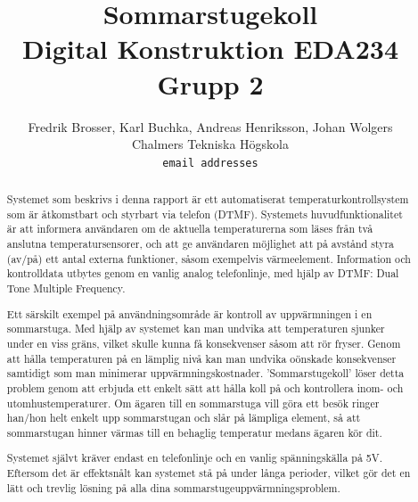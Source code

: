 \documentclass[a4paper,11pt]{article}
\begin{document}
\title{Sommarstugekoll \\
	Digital Konstruktion EDA234 \\ Grupp 2}
\author{Fredrik Brosser, Karl Buchka, Andreas Henriksson, Johan Wolgers \\
   Chalmers Tekniska Högskola \\
   \texttt{email addresses}}

\maketitle

\pagebreak

\tableofcontents

\pagebreak

\begin{abstract}

	Systemet som beskrivs i denna rapport är ett automatiserat temperaturkontrollsystem som är åtkomstbart och styrbart via
	telefon (DTMF). Systemets huvudfunktionalitet är att informera användaren om de aktuella temperaturerna som läses från
	två anslutna temperatursensorer, och att ge användaren möjlighet att på avstånd styra (av/på) ett antal externa funktioner,
	såsom exempelvis värmeelement. Information och kontrolldata utbytes genom en vanlig analog telefonlinje, med hjälp av DTMF:
	Dual Tone Multiple Frequency. 

	Ett särskilt exempel på användningsområde är kontroll av uppvärmningen i en sommarstuga. Med hjälp av systemet kan man
	undvika att temperaturen sjunker under en viss gräns, vilket skulle kunna få konsekvenser såsom att rör fryser. Genom att
	hålla temperaturen på en lämplig nivå kan man undvika oönskade konsekvenser samtidigt som man minimerar uppvärmningskostnader.
	'Sommarstugekoll' löser detta problem genom att erbjuda ett enkelt sätt att hålla koll på och kontrollera inom- och utomhustemperaturer.
	Om ägaren till en sommarstuga vill göra ett besök ringer han/hon helt enkelt upp sommarstugan och slår på lämpliga element, så att
	sommarstugan hinner värmas till en behaglig temperatur medans ägaren kör dit.

	Systemet självt kräver endast en telefonlinje och en vanlig spänningskälla på 5V. Eftersom det är effektsnålt kan systemet stå
	på under långa perioder, vilket gör det en lätt och trevlig lösning på alla dina sommarstugeuppvärmningsproblem.

\end{abstract}
\end{document}

